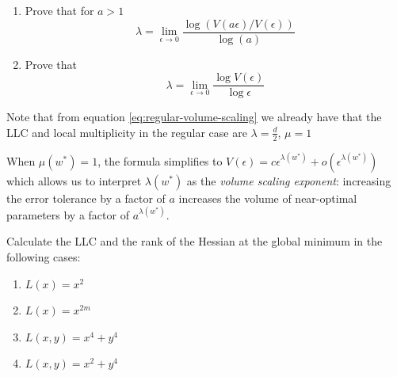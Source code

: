 \documentclass[11pt]{article}
\begin{document}
\begin{exercise} \label{ex:solving-for-lambda}
\begin{enumerate}
    \item Prove that for $a>1$
    \begin{equation} \label{eq:llc-formula}
    \lambda = \lim_{\epsilon \to 0} \frac{\log(V(a\epsilon)/V(\epsilon))}{\log(a)}
    \end{equation}
    
    \item Prove that \begin{equation} \label{eq:solve-LLC}
    \lambda = \lim\limits_{\epsilon\to 0} \frac{\log V(\epsilon)}{\log \epsilon} \end{equation}
\end{enumerate}
\end{exercise}

Note that from equation \eqref{eq:regular-volume-scaling} we already have that the LLC and local multiplicity in the regular case are $\lambda = \frac{d}{2}$, $\mu=1$

When $\mu(w^*) = 1$, the formula simplifies to $V(\epsilon) = c\epsilon^{\lambda(w^*)} + o(\epsilon^{\lambda(w^*)})$ which allows us to interpret $\lambda(w^*)$ as the \textit{volume scaling exponent}: increasing the error tolerance by a factor of $a$ increases the volume of near-optimal parameters by a factor of $a^{\lambda(w^*)}$.

\begin{exercise}
\label{ex:calculating-llc}
    Calculate the LLC and the rank of the Hessian at the global minimum in the following cases:
    \begin{enumerate}
        \item $L(x)=x^2$
        \item $L(x) = x^{2m}$
        \item $L(x,y) = x^4 + y^4$ 
        \item \label{ex:calculating-LLC-d} $L(x,y) = x^2+y^4$
    \end{enumerate}
\end{exercise}
\end{document}
